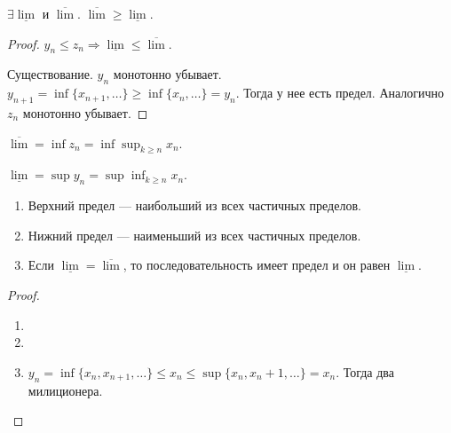 \begin{theorem}
    $\exists \underline{\lim}$ и $\overline{\lim}$.  $\overline{\lim} \ge \underline{\lim}$.
\end{theorem}
\begin{proof}
    $y_n \le z_n \Rightarrow \underline{\lim} \le \overline{\lim}$.

    Существование. $y_n$ монотонно убывает.  $y_{n+1} = \inf \{x_{n+1},\ldots\} \ge \inf\{x_n,\ldots\} = y_n$. Тогда у нее есть предел. Аналогично $z_n$ монотонно убывает.
\end{proof}
\begin{remark}
    $\overline{\lim} = \inf z_n = \inf \sup_{k \ge n} x_n$.

    $\underline{\lim} = \sup y_n = \sup \inf_{k \ge n} x_n$.
\end{remark}

\begin{theorem}
    \slashn
    \begin{enumerate}
        \item Верхний предел --- наибольший из всех частичных пределов.
        \item Нижний предел --- наименьший из всех частичных пределов.
        \item Если $\underline{\lim} = \overline{\lim}$, то последовательность имеет предел и он равен  $\underline{\lim}$.
    \end{enumerate}
\end{theorem}
\begin{proof}
    \slashn
    \begin{enumerate}
        \item
        \item
        \item $y_n = \inf \{x_n, x_{n+1},\ldots\} \le x_n \le \sup \{x_n, x_n+1,\ldots\} = x_n$. Тогда два милиционера.
    \end{enumerate}
\end{proof}
